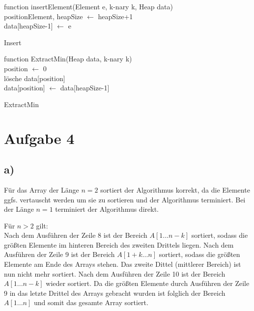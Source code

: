 \documentclass[a4paper]{scrartcl}
\begin{document}
\begin{algorithm}[H]
 function insertElement(Element e, k-nary k, Heap data)\\
 	positionElement, heapSize $\leftarrow$ heapSize+1\\
 	data[heapSize-1] $\leftarrow$ e\\
 	
 \caption{Insert}
\end{algorithm}

\begin{algorithm}[H]
 function ExtractMin(Heap data, k-nary k)\\
  position $\leftarrow$ 0\\
  lösche data[position]\\
  data[position] $\leftarrow$ data[heapSize-1]\\
 \caption{ExtractMin}
\end{algorithm}

\section*{Aufgabe 4}
\subsection*{a)}
Für das Array der Länge $n = 2$ sortiert der Algorithmus korrekt, da die Elemente ggfs. vertauscht werden um sie zu sortieren und der Algorithmus terminiert. Bei der Länge $n = 1$ terminiert der Algorithmus direkt.

Für $n > 2$ gilt: \\
Nach dem Ausführen der Zeile 8 ist der Bereich $A\left[ 1...n-k \right]$ sortiert, sodass die größten Elemente im hinteren Bereich des zweiten Drittels liegen. Nach dem Ausführen der Zeile 9 ist der Bereich $A\left[1+k...n\right]$ sortiert, sodass die größten Elemente am Ende des Arrays stehen. Das zweite Dittel (mittlerer Bereich) ist nun nicht mehr sortiert. Nach dem Ausführen der Zeile 10 ist der Bereich $A\left[ 1...n-k \right]$ wieder sortiert. Da die größten Elemente durch Ausführen der Zeile 9 in das letzte Drittel des Arrays gebracht wurden ist folglich der Bereich $A\left[ 1...n \right]$ und somit das gesamte Array sortiert.
\end{document}
